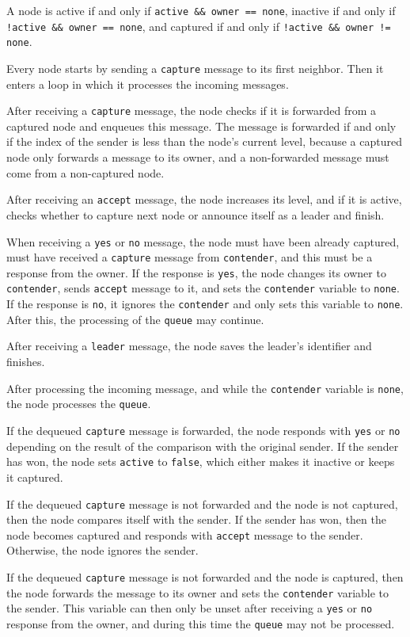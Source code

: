 \documentclass[a4paper,12pt]{article}
\newcommand{\tcapture}{\texttt{capture}\xspace}
\newcommand{\taccept}{\texttt{accept}\xspace}
\newcommand{\tyes}{\texttt{yes}\xspace}
\newcommand{\tno}{\texttt{no}\xspace}
\newcommand{\tleader}{\texttt{leader}\xspace}
\newcommand{\tactive}{\texttt{active}\xspace}
\newcommand{\tqueue}{\texttt{queue}\xspace}
\newcommand{\tcontender}{\texttt{contender}\xspace}
\newcommand{\tnone}{\texttt{none}\xspace}
\newcommand{\tfalse}{\texttt{false}\xspace}
\begin{document}
A node is active if and only if \texttt{active \&\& owner == none},
inactive if and only if \texttt{!active \&\& owner == none},
and captured if and only if \texttt{!active \&\& owner != none}.

Every node starts by sending a \tcapture message to its first neighbor.
Then it enters a loop in which it processes the incoming messages.

After receiving a \tcapture message, the node checks if it is forwarded from a captured node and enqueues this message.
The message is forwarded if and only if the index of the sender is less than the node's current level,
because a captured node only forwards a message to its owner, and a non-forwarded message must come from a non-captured node.

After receiving an \taccept message, the node increases its level,
and if it is active, checks whether to capture next node or announce itself as a leader and finish.

When receiving a \tyes or \tno message, the node must have been already captured,
must have received a \tcapture message from \tcontender, and this must be a response from the owner.
If the response is \tyes, the node changes its owner to \tcontender,
sends \taccept message to it, and sets the \tcontender variable to \tnone.
If the response is \tno, it ignores the \tcontender and only sets this variable to \tnone.
After this, the processing of the \tqueue may continue.

After receiving a \tleader message, the node saves the leader's identifier and finishes.

After processing the incoming message, and while the \tcontender variable is \tnone, the node processes the \tqueue.

If the dequeued \tcapture message is forwarded, the node responds with \tyes or \tno
depending on the result of the comparison with the original sender.
If the sender has won, the node sets \tactive to \tfalse, which either makes it inactive or keeps it captured.

If the dequeued \tcapture message is not forwarded and the node is not captured, then the node compares itself with the sender.
If the sender has won, then the node becomes captured and responds with \taccept message to the sender.
Otherwise, the node ignores the sender.

If the dequeued \tcapture message is not forwarded and the node is captured,
then the node forwards the message to its owner and sets the \tcontender variable to the sender.
This variable can then only be unset after receiving a \tyes or \tno response from the owner,
and during this time the \tqueue may not be processed.
\end{document}
